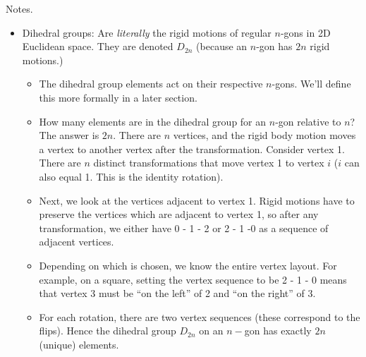 \documentclass[1    0pt, answers]{exam} \renewcommand{\baselinestretch}{1.05}
\theoremstyle{plain}
\theoremstyle{definition}
\begin{document}
\begin{questions}
Notes.
\begin{itemize}
    \item Dihedral groups: Are \emph{literally} the rigid motions of regular $n$-gons in 2D Euclidean space. They are denoted $D_{2n}$ (because an $n$-gon has $2n$ rigid motions.)
    \begin{itemize}
    \item The dihedral group elements act on their respective $n$-gons. We'll define this more formally in a later section.
    \item How many elements are in the dihedral group for an $n$-gon relative to $n$? The answer is $2n$. There are $n$ vertices, and the rigid body motion moves a vertex to another vertex after the transformation. Consider vertex 1. There are $n$ distinct  transformations that move vertex 1 to vertex $i$ ($i$ can also equal 1. This is the identity rotation).
    \item Next, we look at the vertices adjacent to vertex 1. Rigid motions have to preserve the vertices which are adjacent to vertex 1, so after any transformation, we either have 0 - 1 - 2 or 2 - 1 -0 as a sequence of adjacent vertices.
    \item Depending on which is chosen, we know the entire vertex layout. For example, on a square, setting the vertex sequence to be 2 - 1 - 0 means that vertex 3 must be ``on the left'' of 2 and ``on the right'' of 3.
    \item For each rotation, there are two vertex sequences (these correspond to the flips). Hence the dihedral group $D_{2n}$ on an $n-$gon has exactly $2n$ (unique) elements.
    \end{itemize}
    

\end{itemize}
\end{questions}
\end{document}

